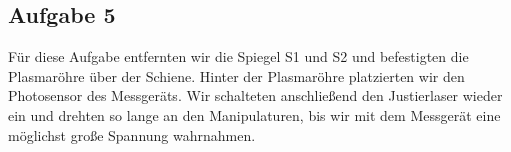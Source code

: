 \subsection{Aufgabe 5}

Für diese Aufgabe entfernten wir die Spiegel S1 und S2 und befestigten die Plasmaröhre über der Schiene. Hinter der Plasmaröhre platzierten wir den Photosensor des Messgeräts. Wir schalteten anschließend den Justierlaser wieder ein und drehten so lange an den Manipulaturen, bis wir mit dem Messgerät eine möglichst große Spannung wahrnahmen.